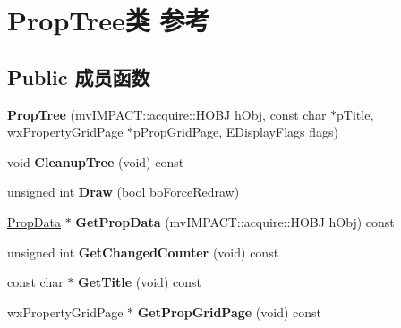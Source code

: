 \hypertarget{class_prop_tree}{\section{Prop\+Tree类 参考}
\label{class_prop_tree}
}
\subsection*{Public 成员函数}
\begin{DoxyCompactItemize}
\item 
\hypertarget{class_prop_tree_adaf0218d8719df8662e5d97f2c864131}{{\bfseries Prop\+Tree} (mv\+I\+M\+P\+A\+C\+T\+::acquire\+::\+H\+O\+B\+J h\+Obj, const char $\ast$p\+Title, wx\+Property\+Grid\+Page $\ast$p\+Prop\+Grid\+Page, E\+Display\+Flags flags)}\label{class_prop_tree_adaf0218d8719df8662e5d97f2c864131}

\item 
\hypertarget{class_prop_tree_af38ab516bcc4c9d360b54770c9fc79a6}{void {\bfseries Cleanup\+Tree} (void) const }\label{class_prop_tree_af38ab516bcc4c9d360b54770c9fc79a6}

\item 
\hypertarget{class_prop_tree_ae0c08ec958850b54ae8b94fa9dd04f62}{unsigned int {\bfseries Draw} (bool bo\+Force\+Redraw)}\label{class_prop_tree_ae0c08ec958850b54ae8b94fa9dd04f62}

\item 
\hypertarget{class_prop_tree_ab3769a63b5d9212853ba76a5ab72e0e9}{\hyperlink{class_prop_data}{Prop\+Data} $\ast$ {\bfseries Get\+Prop\+Data} (mv\+I\+M\+P\+A\+C\+T\+::acquire\+::\+H\+O\+B\+J h\+Obj) const }\label{class_prop_tree_ab3769a63b5d9212853ba76a5ab72e0e9}

\item 
\hypertarget{class_prop_tree_a5507d1b12e2fffd053d96e113c933222}{unsigned int {\bfseries Get\+Changed\+Counter} (void) const }\label{class_prop_tree_a5507d1b12e2fffd053d96e113c933222}

\item 
\hypertarget{class_prop_tree_a8c0667bd00224f479c79531d10af1e70}{const char $\ast$ {\bfseries Get\+Title} (void) const }\label{class_prop_tree_a8c0667bd00224f479c79531d10af1e70}

\item 
\hypertarget{class_prop_tree_ac672ae808e7e621fd299a1fd1dc0ca42}{wx\+Property\+Grid\+Page $\ast$ {\bfseries Get\+Prop\+Grid\+Page} (void) const }\label{class_prop_tree_ac672ae808e7e621fd299a1fd1dc0ca42}

\end{DoxyCompactItemize}
